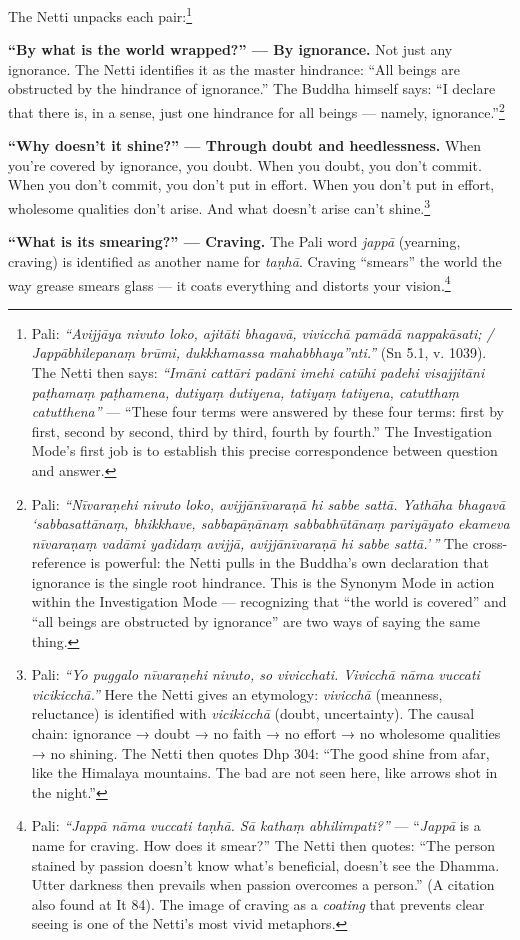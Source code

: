 The Netti unpacks each pair:\footnote{Pali: \textit{``Avijjāya nivuto loko, ajitāti bhagavā, vivicchā pamādā nappakāsati; / Jappābhilepanaṃ brūmi, dukkhamassa mahabbhaya''nti.''} (Sn 5.1, v. 1039). The Netti then says: \textit{``Imāni cattāri padāni imehi catūhi padehi visajjitāni paṭhamaṃ paṭhamena, dutiyaṃ dutiyena, tatiyaṃ tatiyena, catutthaṃ catutthena''} --- ``These four terms were answered by these four terms: first by first, second by second, third by third, fourth by fourth.'' The Investigation Mode's first job is to establish this precise correspondence between question and answer.}

\textbf{``By what is the world wrapped?'' --- By ignorance.} Not just any ignorance. The Netti identifies it as the master hindrance: ``All beings are obstructed by the hindrance of ignorance.'' The Buddha himself says: ``I declare that there is, in a sense, just one hindrance for all beings --- namely, ignorance.''\footnote{Pali: \textit{``Nīvaraṇehi nivuto loko, avijjānīvaraṇā hi sabbe sattā. Yathāha bhagavā `sabbasattānaṃ, bhikkhave, sabbapāṇānaṃ sabbabhūtānaṃ pariyāyato ekameva nīvaraṇaṃ vadāmi yadidaṃ avijjā, avijjānīvaraṇā hi sabbe sattā.'\,''} The cross-reference is powerful: the Netti pulls in the Buddha's own declaration that ignorance is the single root hindrance. This is the Synonym Mode in action within the Investigation Mode --- recognizing that ``the world is covered'' and ``all beings are obstructed by ignorance'' are two ways of saying the same thing.}

\textbf{``Why doesn't it shine?'' --- Through doubt and heedlessness.} When you're covered by ignorance, you doubt. When you doubt, you don't commit. When you don't commit, you don't put in effort. When you don't put in effort, wholesome qualities don't arise. And what doesn't arise can't shine.\footnote{Pali: \textit{``Yo puggalo nīvaraṇehi nivuto, so vivicchati. Vivicchā nāma vuccati vicikicchā.''} Here the Netti gives an etymology: \textit{vivicchā} (meanness, reluctance) is identified with \textit{vicikicchā} (doubt, uncertainty). The causal chain: ignorance → doubt → no faith → no effort → no wholesome qualities → no shining. The Netti then quotes Dhp 304: ``The good shine from afar, like the Himalaya mountains. The bad are not seen here, like arrows shot in the night.''}

\textbf{``What is its smearing?'' --- Craving.} The Pali word \textit{jappā} (yearning, craving) is identified as another name for \textit{taṇhā}. Craving ``smears'' the world the way grease smears glass --- it coats everything and distorts your vision.\footnote{Pali: \textit{``Jappā nāma vuccati taṇhā. Sā kathaṃ abhilimpati?''} --- ``\textit{Jappā} is a name for craving. How does it smear?'' The Netti then quotes: ``The person stained by passion doesn't know what's beneficial, doesn't see the Dhamma. Utter darkness then prevails when passion overcomes a person.'' (A citation also found at It 84). The image of craving as a \textit{coating} that prevents clear seeing is one of the Netti's most vivid metaphors.}


